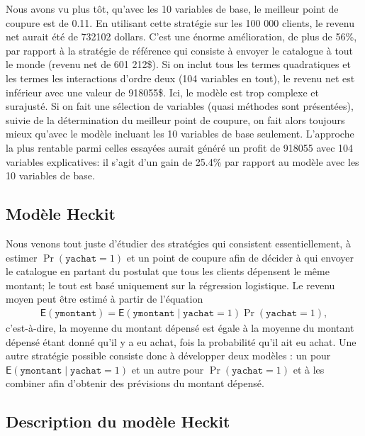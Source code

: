 \documentclass[
  11pt,
  letterpaper,
]{scrbook}
\theoremstyle{definition}
\theoremstyle{remark}
\begin{document}
Nous avons vu plus tôt, qu'avec les 10 variables de base, le meilleur
point de coupure est de 0.11. En utilisant cette stratégie sur les 100
000 clients, le revenu net aurait été de 732102 dollars. C'est une
énorme amélioration, de plus de 56\%, par rapport à la stratégie de
référence qui consiste à envoyer le catalogue à tout le monde (revenu
net de 601 212\$). Si on inclut tous les termes quadratiques et les
termes les interactions d'ordre deux (104 variables en tout), le revenu
net est inférieur avec une valeur de 918055\$. Ici, le modèle est trop
complexe et surajusté. Si on fait une sélection de variables (quasi
méthodes sont présentées), suivie de la détermination du meilleur point
de coupure, on fait alors toujours mieux qu'avec le modèle incluant les
10 variables de base seulement. L'approche la plus rentable parmi celles
essayées aurait généré un profit de 918055 avec 104 variables
explicatives: il s'agit d'un gain de 25.4\% par rapport au modèle avec
les 10 variables de base.

\hypertarget{moduxe8le-heckit}{%
\subsection{Modèle Heckit}\label{moduxe8le-heckit}}

Nous venons tout juste d'étudier des stratégies qui consistent
essentiellement, à estimer \(\Pr(\texttt{yachat}=1)\) et un point de
coupure afin de décider à qui envoyer le catalogue en partant du
postulat que tous les clients dépensent le même montant; le tout est
basé uniquement sur la régression logistique. Le revenu moyen peut être
estimé à partir de l'équation \begin{align*}
\mathsf{E}(\texttt{ymontant}) = \mathsf{E}(\texttt{ymontant} \mid \texttt{yachat}=1) \Pr(\texttt{yachat
}=1),
\end{align*} c'est-à-dire, la moyenne du montant dépensé est égale à la
moyenne du montant dépensé étant donné qu'il y a eu achat, fois la
probabilité qu'il ait eu achat. Une autre stratégie possible consiste
donc à développer deux modèles : un pour
\(\mathsf{E}(\texttt{ymontant} \mid \texttt{yachat}=1)\) et un autre
pour \(\Pr(\texttt{yachat}=1)\) et à les combiner afin d'obtenir des
prévisions du montant dépensé.

\hypertarget{description-du-moduxe8le-heckit}{%
\subsection*{Description du modèle
Heckit}\label{description-du-moduxe8le-heckit}}
\end{document}
